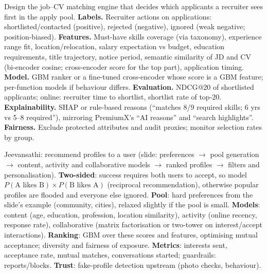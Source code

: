 \begin{qa}{\deep Design the job--CV matching engine that decides which applicants a recruiter sees first in the apply pool.}
\why
\textbf{Labels.} Recruiter actions on applications: shortlisted/contacted (positive), rejected (negative), ignored (weak negative; position-biased).
\textbf{Features.} Must-have skills coverage (via taxonomy), experience range fit, location/relocation, salary expectation vs budget, education requirements, title trajectory, notice period,
semantic similarity of JD and CV (bi-encoder cosine; cross-encoder score for the top part), application timing.
\textbf{Model.} GBM ranker or a fine-tuned cross-encoder whose score is a GBM feature; per-function models if behaviour differs.
\textbf{Evaluation.} NDCG@20 of shortlisted applicants; online: recruiter time to shortlist, shortlist rate of top-20.
\textbf{Explainability.} SHAP or rule-based reasons (``matches 8/9 required skills; 6 yrs vs 5--8 required''), mirroring PremiumX's ``AI reasons'' and ``search highlights''.
\textbf{Fairness.} Exclude protected attributes and audit proxies; monitor selection rates by group.
\end{qa}

\begin{qa}{\deep Jeevansathi: recommend profiles to a user (slide: preferences $\to$ pool generation $\to$ content, activity and collaborative models $\to$ ranked profiles $\to$ filters and
personalisation).}
\why
\textbf{Two-sided}: success requires both users to accept, so model $P(\text{A likes B})\times P(\text{B likes A})$ (reciprocal recommendation), otherwise popular profiles are flooded and
everyone else ignored.
\textbf{Pool}: hard preferences from the slide's example (community, cities), relaxed slightly if the pool is small.
\textbf{Models}: content (age, education, profession, location similarity), activity (online recency, response rate), collaborative (matrix factorisation or two-tower on interest/accept
interactions).
\textbf{Ranking}: GBM over these scores and features, optimising mutual acceptance; diversity and fairness of exposure.
\textbf{Metrics}: interests sent, acceptance rate, mutual matches, conversations started; guardrails: reports/blocks.
\textbf{Trust}: fake-profile detection upstream (photo checks, behaviour).
\end{qa}

